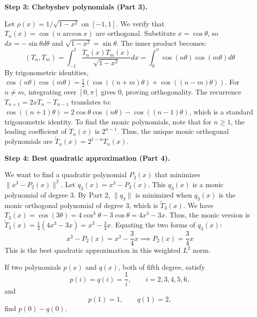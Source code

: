 \begin{solution}
\textbf{Step 3: Chebyshev polynomials (Part 3).}

Let $\rho(x) = 1/\sqrt{1-x^2}$ on $[-1, 1]$. We verify that $T_n(x) = \cos(n \arccos x)$ are orthogonal.
Substitute $x = \cos \theta$, so $dx = -\sin \theta d\theta$ and $\sqrt{1-x^2} = \sin \theta$. The inner product becomes:
\[ (T_n, T_m) = \int_{-1}^1 \frac{T_n(x)T_m(x)}{\sqrt{1-x^2}} dx = \int_0^\pi \cos(n\theta) \cos(m\theta) d\theta \]
By trigonometric identities, $\cos(n\theta) \cos(m\theta) = \frac{1}{2}(\cos((n+m)\theta) + \cos((n-m)\theta))$.
For $n \neq m$, integrating over $[0, \pi]$ gives 0, proving orthogonality.
The recurrence $T_{n+1} = 2x T_n - T_{n-1}$ translates to:
$\cos((n+1)\theta) = 2 \cos\theta \cos(n\theta) - \cos((n-1)\theta)$,
which is a standard trigonometric identity.
To find the monic polynomials, note that for $n \geq 1$, the leading coefficient of $T_n(x)$ is $2^{n-1}$. Thus, the unique monic orthogonal polynomials are $\tilde{T}_n(x) = 2^{1-n} T_n(x)$.

\textbf{Step 4: Best quadratic approximation (Part 4).}

We want to find a quadratic polynomial $P_2(x)$ that minimizes $\|x^3 - P_2(x)\|^2$.
Let $q_3(x) = x^3 - P_2(x)$. This $q_3(x)$ is a monic polynomial of degree 3.
By Part 2, $\|q_3\|$ is minimized when $q_3(x)$ is the monic orthogonal polynomial of degree 3, which is $\tilde{T}_3(x)$.
We have $T_3(x) = \cos(3\theta) = 4\cos^3\theta - 3\cos\theta = 4x^3 - 3x$.
Thus, the monic version is $\tilde{T}_3(x) = \frac{1}{4}(4x^3 - 3x) = x^3 - \frac{3}{4}x$.
Equating the two forms of $q_3(x)$:
\[ x^3 - P_2(x) = x^3 - \frac{3}{4}x \implies P_2(x) = \frac{3}{4}x \]
This is the best quadratic approximation in this weighted $L^2$ norm.
\end{solution}

\begin{exercise}\label{probability:2011:2}
If two polynomials $p(x)$ and $q(x)$, both of fifth degree, satisfy
\[
p(i) = q(i) = \frac{1}{i}, \qquad i = 2, 3, 4, 5, 6,
\]
and
\[
p(1) = 1, \qquad q(1) = 2,
\]
find $p(0) - q(0)$.
\end{exercise}

